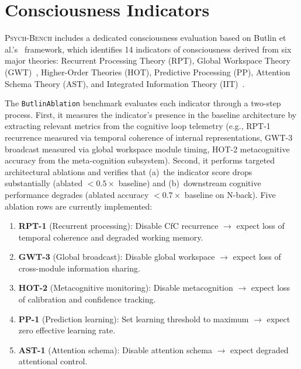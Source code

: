 \documentclass[11pt,letterpaper]{article}
\newcommand{\psychbench}{\textsc{Psych-Bench}}
\begin{document}
\section{Consciousness Indicators}
\label{sec:consciousness}

\psychbench{} includes a dedicated consciousness evaluation based on Butlin et al.'s~\citep{butlin2023consciousness} framework, which identifies 14 indicators of consciousness derived from six major theories: Recurrent Processing Theory (RPT), Global Workspace Theory (GWT)~\citep{baars1988cognitive}, Higher-Order Theories (HOT), Predictive Processing (PP), Attention Schema Theory (AST), and Integrated Information Theory (IIT)~\citep{tononi2004information,oizumi2014phenomenology}.

The \texttt{ButlinAblation} benchmark evaluates each indicator through a two-step process. First, it measures the indicator's presence in the baseline architecture by extracting relevant metrics from the cognitive loop telemetry (e.g., RPT-1 recurrence measured via temporal coherence of internal representations, GWT-3 broadcast measured via global workspace module timing, HOT-2 metacognitive accuracy from the meta-cognition subsystem). Second, it performs targeted architectural ablations and verifies that (a)~the indicator score drops substantially (ablated $< 0.5 \times$ baseline) and (b)~downstream cognitive performance degrades (ablated accuracy $< 0.7 \times$ baseline on N-back). Five ablation rows are currently implemented:

\begin{enumerate}[nosep]
    \item \textbf{RPT-1} (Recurrent processing): Disable CfC recurrence $\to$ expect loss of temporal coherence and degraded working memory.
    \item \textbf{GWT-3} (Global broadcast): Disable global workspace $\to$ expect loss of cross-module information sharing.
    \item \textbf{HOT-2} (Metacognitive monitoring): Disable metacognition $\to$ expect loss of calibration and confidence tracking.
    \item \textbf{PP-1} (Prediction learning): Set learning threshold to maximum $\to$ expect zero effective learning rate.
    \item \textbf{AST-1} (Attention schema): Disable attention schema $\to$ expect degraded attentional control.
\end{enumerate}
\end{document}
